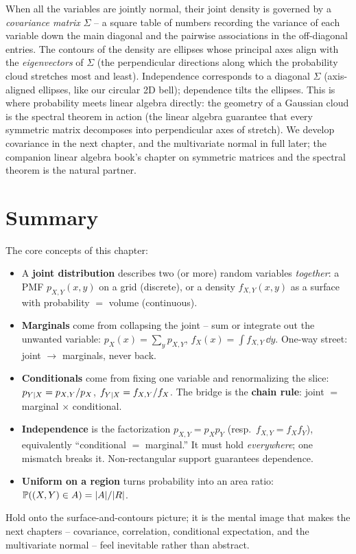 \begin{connectionbox}
When all the variables are jointly normal, their joint density is governed by a
\emph{covariance matrix} $\Sigma$ -- a square table of numbers recording the
variance of each variable down the main diagonal and the pairwise associations
in the off-diagonal entries. The contours of the density are ellipses whose
principal axes align with the \emph{eigenvectors} of $\Sigma$ (the perpendicular
directions along which the probability cloud stretches most and least).
Independence corresponds to a diagonal $\Sigma$ (axis-aligned ellipses, like our
circular 2D bell); dependence tilts the ellipses. This is where probability
meets linear algebra directly: the geometry of a Gaussian cloud is the
spectral theorem in action (the linear algebra guarantee that every symmetric
matrix decomposes into perpendicular axes of stretch). We develop covariance in
the next chapter, and the multivariate normal in full later; the companion linear
algebra book's chapter on symmetric matrices and the spectral theorem is the
natural partner.
\end{connectionbox}

\section{Summary}
\label{ch13:summary}

\begin{recoverybox}
The core concepts of this chapter:
\begin{itemize}
  \item A \textbf{joint distribution} describes two (or more) random variables
        \emph{together}: a PMF $p_{X,Y}(x,y)$ on a grid (discrete), or a density
        $f_{X,Y}(x,y)$ as a surface with probability $=$ volume (continuous).
  \item \textbf{Marginals} come from collapsing the joint -- sum or integrate out
        the unwanted variable: $p_X(x)=\sum_y p_{X,Y}$,
        $f_X(x)=\int f_{X,Y}\,\dd y$. One-way street: joint $\to$ marginals,
        never back.
  \item \textbf{Conditionals} come from fixing one variable and renormalizing the
        slice: $p_{Y\mid X}=p_{X,Y}/p_X$, $f_{Y\mid X}=f_{X,Y}/f_X$. The
        bridge is the \textbf{chain rule}: joint $=$ marginal $\times$ conditional.
  \item \textbf{Independence} is the factorization
        $p_{X,Y}=p_X p_Y$ (resp.\ $f_{X,Y}=f_X f_Y$), equivalently
        ``conditional $=$ marginal.'' It must hold \emph{everywhere}; one
        mismatch breaks it. Non-rectangular support guarantees dependence.
  \item \textbf{Uniform on a region} turns probability into an area ratio:
        $\operatorname{\mathbb{P}}((X,Y)\in A) = \lvert A\rvert/\lvert R\rvert$.
\end{itemize}
Hold onto the surface-and-contours picture; it is the mental image that makes the
next chapters -- covariance, correlation, conditional expectation, and the
multivariate normal -- feel inevitable rather than abstract.
\end{recoverybox}


